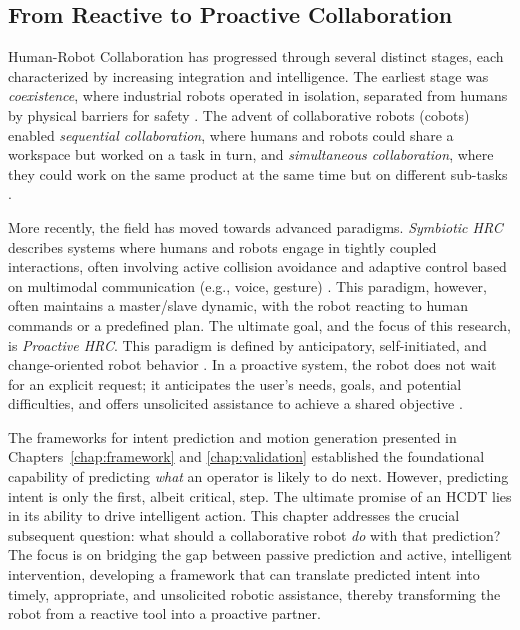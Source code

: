 \subsection{From Reactive to Proactive Collaboration}

Human-Robot Collaboration has progressed through several distinct stages, each characterized by increasing integration and intelligence. The earliest stage was \emph{coexistence}, where industrial robots operated in isolation, separated from humans by physical barriers for safety \citep{Asad2023}. The advent of collaborative robots (cobots) enabled \emph{sequential collaboration}, where humans and robots could share a workspace but worked on a task in turn, and \emph{simultaneous collaboration}, where they could work on the same product at the same time but on different sub-tasks \citep{Zhou2024}.

More recently, the field has moved towards advanced paradigms. \emph{Symbiotic HRC} describes systems where humans and robots engage in tightly coupled interactions, often involving active collision avoidance and adaptive control based on multimodal communication (e.g., voice, gesture) \citep{Andronas2021, Asad2023}. This paradigm, however, often maintains a master/slave dynamic, with the robot reacting to human commands or a predefined plan. The ultimate goal, and the focus of this research, is \emph{Proactive HRC}. This paradigm is defined by anticipatory, self-initiated, and change-oriented robot behavior \citep{Sirintuna2024}. In a proactive system, the robot does not wait for an explicit request; it anticipates the user's needs, goals, and potential difficulties, and offers unsolicited assistance to achieve a shared objective \citep{Andronas2021, Nezhad2020}.

The frameworks for intent prediction and motion generation presented in Chapters~\ref{chap:framework} and \ref{chap:validation} established the foundational capability of predicting \emph{what} an operator is likely to do next. However, predicting intent is only the first, albeit critical, step. The ultimate promise of an HCDT lies in its ability to drive intelligent action. This chapter addresses the crucial subsequent question: what should a collaborative robot \emph{do} with that prediction? The focus is on bridging the gap between passive prediction and active, intelligent intervention, developing a framework that can translate predicted intent into timely, appropriate, and unsolicited robotic assistance, thereby transforming the robot from a reactive tool into a proactive partner.

